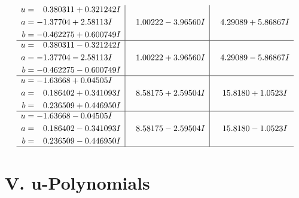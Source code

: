 \documentclass[1p]{elsarticle_modified}
\theoremstyle{definition}
\begin{document}
$$\begin{array}{c|c|c}
\begin{aligned}
u &= \phantom{-}0.380311 + 0.321242 I \\
a &= -1.37704 + 2.58113 I \\
b &= -0.462275 + 0.600749 I\end{aligned}
 & \phantom{-}1.00222 - 3.96560 I & \phantom{-}4.29089 + 5.86867 I \\ \hline\begin{aligned}
u &= \phantom{-}0.380311 - 0.321242 I \\
a &= -1.37704 - 2.58113 I \\
b &= -0.462275 - 0.600749 I\end{aligned}
 & \phantom{-}1.00222 + 3.96560 I & \phantom{-}4.29089 - 5.86867 I \\ \hline\begin{aligned}
u &= -1.63668 + 0.04505 I \\
a &= \phantom{-}0.186402 + 0.341093 I \\
b &= \phantom{-}0.236509 + 0.446950 I\end{aligned}
 & \phantom{-}8.58175 + 2.59504 I & \phantom{-}15.8180 + 1.0523 I \\ \hline\begin{aligned}
u &= -1.63668 - 0.04505 I \\
a &= \phantom{-}0.186402 - 0.341093 I \\
b &= \phantom{-}0.236509 - 0.446950 I\end{aligned}
 & \phantom{-}8.58175 - 2.59504 I & \phantom{-}15.8180 - 1.0523 I\\
 \hline 
 \end{array}$$\newpage
\newpage\renewcommand{\arraystretch}{1}
\centering \section*{ V. u-Polynomials}
\end{document}
